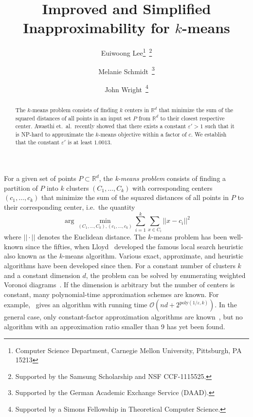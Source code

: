 \documentclass{scrartcl}
\begin{document}
\title{Improved and Simplified Inapproximability for $k$-means}
\author{Euiwoong Lee\thanks{Computer Science Department, Carnegie Mellon University, Pittsburgh, PA 15213}~\thanks{Supported by the Samsung Scholarship and NSF CCF-1115525.} \and Melanie Schmidt\footnotemark[1]~\thanks{Supported by the German Academic Exchange Service (DAAD).} \and John Wright\footnotemark[1]~\thanks{Supported by a Simons Fellowship in Theoretical Computer Science.}}




\maketitle
\begin{abstract}
The $k$-means problem consists of finding $k$ centers in $\mathbb{R}^d$ that minimize the sum of the squared distances of all points in an input set $P$ from $\mathbb{R}^d$ to their closest respective center. 
Awasthi et.\ al.\ recently showed that there exists a constant $\varepsilon' > 1$ such that it is NP-hard to approximate the $k$-means objective within a factor of $c$. We establish that the constant $\varepsilon'$ is at least $1.0013$. 
\end{abstract}

For a given set of points $P \subset \mathbb{R}^d$, the \emph{k-means problem} consists of finding a partition of $P$ into $k$ clusters $(C_1, \dots, C_k)$ with corresponding centers $(c_1, \dots, c_k)$ that minimize the sum of the squared distances of all points in $P$ to their corresponding center, i.e.\ the quantity
\[
\arg\min_{(C_1, \dots, C_k), (c_1, \dots, c_k)} \sum_{i=1}^k \sum_{x \in C_i} ||x-c_i||^2
\]
where $||\cdot||$ denotes the Euclidean distance.
The $k$-means problem has been well-known since the fifties, when Lloyd~\cite{L57} developed the famous local search heuristic also known as the $k$-means algorithm. Various exact, approximate, and heuristic algorithms have been developed since then. For a constant number of clusters $k$ and a constant dimension $d$, the problem can be solved by enumerating weighted Voronoi diagrams~\cite{IKI94}. If the dimension is arbitrary but the number of centers is constant, many polynomial-time approximation schemes are known. For example,~\cite{FL11} gives an algorithm with running time $\mathcal{O}(n d + 2^{\text{poly}(1/\varepsilon,k)})$. In the general case, only constant-factor approximation algorithms are known~\cite{JV01,KMNPSW04}, but no algorithm with an approximation ratio smaller than 9 has yet been found.
\end{document}
